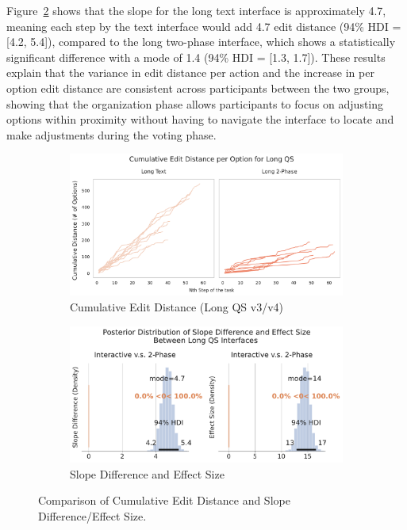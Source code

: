 Figure~\ref{fig:slope-diff-effect} shows that the slope for the long text interface is approximately 4.7, meaning each step by the text interface would add 4.7 edit distance (94\% HDI = [4.2, 5.4]), compared to the long two-phase interface, which shows a statistically significant difference with a mode of 1.4 (94\% HDI = [1.3, 1.7]). These results explain that the variance in edit distance per action and the increase in per option edit distance are consistent across participants between the two groups, showing that the organization phase allows participants to focus on adjusting options within proximity without having to navigate the interface to locate and make adjustments during the voting phase.

\begin{figure}[ht]
    \centering
    \begin{subfigure}[b]{0.48\textwidth}
        \centering
        \includegraphics[width=\textwidth]{content/image/distance/cumulative_edit_distance_per_option_long_qs_v3v4.pdf}
        \caption{Cumulative Edit Distance (Long QS v3/v4)}
        \label{fig:cumulative-distance}
    \end{subfigure}
    \begin{subfigure}[b]{0.48\textwidth}
        \centering
        \includegraphics[width=\textwidth]{content/image/distance/slope_diff_and_effect_size.pdf}
        \caption{Slope Difference and Effect Size}
        \label{fig:slope-diff-effect}
    \end{subfigure}
    \caption{Comparison of Cumulative Edit Distance and Slope Difference/Effect Size.}
    \label{fig:comparison}
\end{figure}

